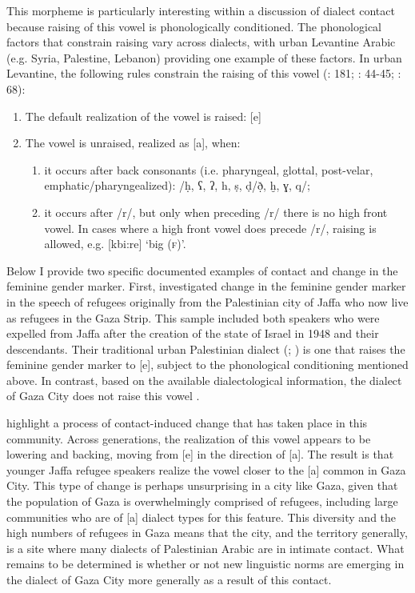\documentclass[output=paper]{langsci/langscibook}
\begin{document}
  This morpheme is particularly interesting within a discussion of dialect contact because raising of this vowel is phonologically conditioned. The phonological factors that constrain raising vary across dialects, with urban Levantine Arabic (e.g. Syria, Palestine, Lebanon) providing one example of these factors. In urban Levantine, the following rules constrain the raising of this vowel (\citealt{Grotzfeld1980}: 181; \citealt{Levin1994}: 44-45; \citealt{Al-Wer2007}: 68):
\begin{enumerate}
    \item The default realization of the vowel is raised: [e]
    \item The vowel is unraised, realized as [a], when:
    \begin{enumerate}
        \item   it occurs after back consonants (i.e. pharyngeal, glottal, post-velar, emphatic/pharyngealized): /ḥ, ʕ, ʔ, h, ṣ, ḍ/ð̣, ḫ, ɣ, q/;
        \item   it occurs after /r/, but only when preceding /r/ there is no   high front vowel. In cases where a high front vowel does   precede /r/, raising is allowed, e.g. [kbi:re] ‘big (\textsc{f})’.
    \end{enumerate}
\end{enumerate}

Below I provide two specific documented examples of contact and change in the feminine gender marker. First, \citet{CotterHoresh2015} investigated change in the feminine gender marker in the speech of refugees originally from the Palestinian city of Jaffa who now live as refugees in the Gaza Strip. This sample included both speakers who were expelled from Jaffa after the creation of the state of Israel in 1948 and their descendants. Their traditional urban Palestinian dialect (\citealt{Horesh2000}; \citealt{Shahin2011}) is one that raises the feminine gender marker to [e], subject to the phonological conditioning mentioned above. In contrast, based on the available dialectological information, the dialect of Gaza City does not raise this vowel \citep{Bergsträßer1915}. 

\citet{CotterHoresh2015} highlight a process of contact-induced change that has taken place in this community. Across generations, the realization of this vowel appears to be lowering and backing, moving from [e] in the direction of [a]. The result is that younger Jaffa refugee speakers realize the vowel closer to the [a] common in Gaza City. This type of change is perhaps unsurprising in a city like Gaza, given that the population of Gaza is overwhelmingly comprised of refugees, including large communities who are of [a] dialect types for this feature. This diversity and the high numbers of refugees in Gaza means that the city, and the territory generally, is a site where many dialects of Palestinian Arabic are in intimate contact. What remains to be determined is whether or not new linguistic norms are emerging in the dialect of Gaza City more generally as a result of this contact.
\end{document}
